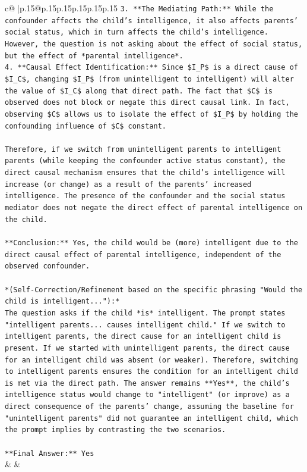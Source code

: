 \documentclass{article}
\begin{document}
{\begin{supertabular}{c@{$\;$}|p{.15\linewidth}@{}p{.15\linewidth}p{.15\linewidth}p{.15\linewidth}p{.15\linewidth}p{.15\linewidth}}
{{{\texttt{3.  **The Mediating Path:** While the confounder affects the child's intelligence, it also affects parents' social status, which in turn affects the child's intelligence. However, the question is not asking about the effect of social status, but the effect of *parental intelligence*.} \\
\texttt{4.  **Causal Effect Identification:** Since \$I\_P\$ is a direct cause of \$I\_C\$, changing \$I\_P\$ (from unintelligent to intelligent) will alter the value of \$I\_C\$ along that direct path. The fact that \$C\$ is observed does not block or negate this direct causal link. In fact, observing \$C\$ allows us to isolate the effect of \$I\_P\$ by holding the confounding influence of \$C\$ constant.} \\
\\ 
\texttt{Therefore, if we switch from unintelligent parents to intelligent parents (while keeping the confounder active status constant), the direct causal mechanism ensures that the child's intelligence will increase (or change) as a result of the parents' increased intelligence. The presence of the confounder and the social status mediator does not negate the direct effect of parental intelligence on the child.} \\
\\ 
\texttt{**Conclusion:** Yes, the child would be (more) intelligent due to the direct causal effect of parental intelligence, independent of the observed confounder.} \\
\\ 
\texttt{*(Self{-}Correction/Refinement based on the specific phrasing "Would the child is intelligent..."):*} \\
\texttt{The question asks if the child *is* intelligent. The prompt states "intelligent parents... causes intelligent child." If we switch to intelligent parents, the direct cause for an intelligent child is present. If we started with unintelligent parents, the direct cause for an intelligent child was absent (or weaker). Therefore, switching to intelligent parents ensures the condition for an intelligent child is met via the direct path. The answer remains **Yes**, the child's intelligence status would change to "intelligent" (or improve) as a direct consequence of the parents' change, assuming the baseline for "unintelligent parents" did not guarantee an intelligent child, which the prompt implies by contrasting the two scenarios.} \\
\\ 
\texttt{**Final Answer:** Yes} \\
            }
        }
    }
    & & \\ \\


\end{supertabular}}
\end{document}
